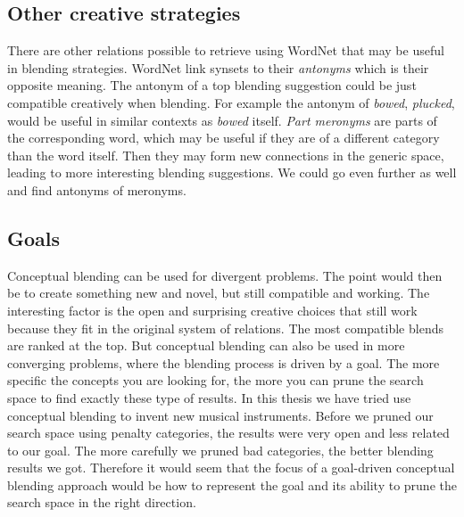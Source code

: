 
\subsection{Other creative strategies}
There are other relations possible to retrieve using WordNet that may be useful in blending strategies. WordNet link synsets to their \emph{antonyms} which is their opposite meaning. The antonym of a top blending suggestion could be just compatible creatively when blending. For example the antonym of \emph{bowed}, \emph{plucked}, would be useful in similar contexts as \emph{bowed} itself. \emph{Part meronyms} are parts of the corresponding word, which may be useful if they are of a different category than the word itself. Then they may form new connections in the generic space, leading to more interesting blending suggestions. We could go even further as well and find antonyms of meronyms.


\subsection{Goals}
Conceptual blending can be used for divergent problems. The point would then be to create something new and novel, but still compatible and working. The interesting factor is the open and surprising creative choices that still work because they fit in the original system of relations. The most compatible blends are ranked at the top. But conceptual blending can also be used in more converging problems, where the blending process is driven by a goal. The more specific the concepts you are looking for, the more you can prune the search space to find exactly these type of results. In this thesis we have tried use conceptual blending to invent new musical instruments. Before we pruned our search space using penalty categories, the results were very open and less related to our goal. The more carefully we pruned bad categories, the better blending results we got. Therefore it would seem that the focus of a goal-driven conceptual blending approach would be how to represent the goal and its ability to prune the search space in the right direction.


